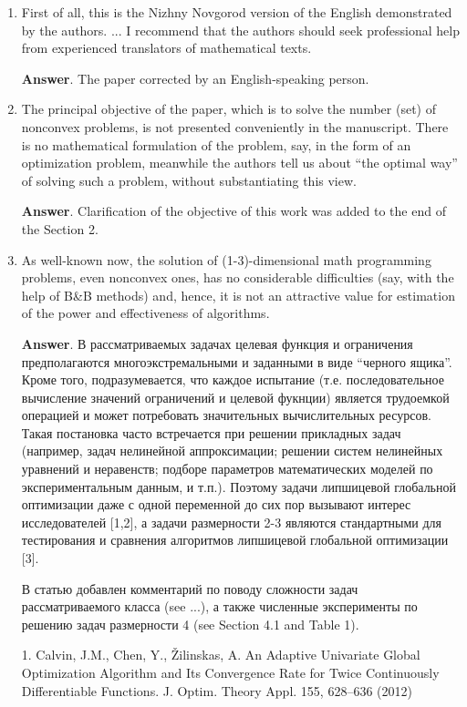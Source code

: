 \documentclass{article}%
\begin{document}
\begin{enumerate}
\item
First of all, this is the Nizhny Novgorod version of the English demonstrated by the authors. ... I recommend that the authors should seek professional help from experienced translators of mathematical texts.

\textbf{Answer}.
The paper corrected by an English-speaking person.

\item The principal objective of the paper, which is to solve the number (set) of nonconvex problems, is not presented conveniently in the manuscript. There is no mathematical formulation of the problem, say, in the form of an optimization problem, meanwhile the authors tell us about “the optimal way” of solving such a problem, without substantiating this view.

\textbf{Answer}.
Clarification of the objective of this work was added to the end of the Section 2.

\item As well-known now, the solution of (1-3)-dimensional math programming problems, even nonconvex ones, has no considerable difficulties (say, with the help of B\&B methods) and, hence, it is not an attractive value for estimation of the power and effectiveness of algorithms.

\textbf{Answer}.
В рассматриваемых задачах целевая функция и ограничения предполагаются многоэкстремальными и заданными в виде ``черного ящика''. Кроме того, подразумевается, что каждое испытание (т.е. последовательное вычисление значений ограничений и целевой фукнции) является трудоемкой операцией и может потребовать значительных вычислительных ресурсов. Такая постановка часто встречается при решении прикладных задач (например, задач нелинейной аппроксимации; решении систем нелинейных уравнений и неравенств; подборе параметров математических моделей по экспериментальным данным, и т.п.). Поэтому задачи липшицевой глобальной оптимизации даже с одной переменной до сих пор вызывают интерес исследователей [1,2], а задачи размерности 2-3 являются стандартными для тестирования и сравнения алгоритмов липшицевой глобальной оптимизации [3].

В статью добавлен комментарий по поводу сложности задач рассматриваемого класса (see ...), а также численные эксперименты
по решению задач размерности 4 (see Section 4.1 and Table 1).

1. Calvin, J.M., Chen, Y., {\v Z}ilinskas, A. An Adaptive Univariate Global Optimization Algorithm and Its Convergence Rate for Twice Continuously Differentiable Functions. J. Optim. Theory Appl. 155, 628–636 (2012)


\end{enumerate}
\end{document}
